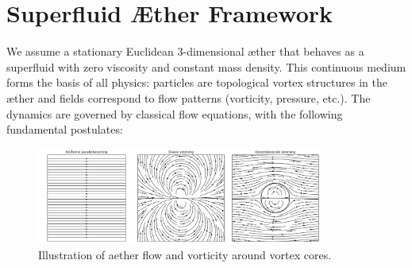 
\section{Superfluid Æther Framework}

We assume a stationary Euclidean 3-dimensional æther that behaves as a superfluid with zero viscosity and constant mass density. This continuous medium forms the basis of all physics: particles are topological vortex structures in the æther and fields correspond to flow patterns (vorticity, pressure, etc.). The dynamics are governed by classical flow equations, with the following fundamental postulates:

\begin{figure}[htbp]
    \centering
    \includegraphics[width=0.85\textwidth]{../03-combined_flow}
    \caption{Illustration of aether flow and vorticity around vortex cores.}
    \label{fig:vortexfields}
\end{figure}
